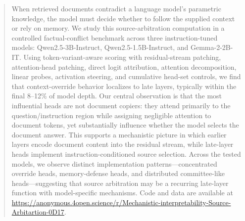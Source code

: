 \documentclass{article}
\begin{document}

\printAffiliationsAndNotice{}

\begin{abstract}
When retrieved documents contradict a language model's parametric knowledge, the model must decide whether to follow the supplied context or rely on memory. We study this source-arbitration computation in a controlled factual-conflict benchmark across three instruction-tuned models: Qwen2.5-3B-Instruct, Qwen2.5-1.5B-Instruct, and Gemma-2-2B-IT. Using token-variant-aware scoring with residual-stream patching, attention-head patching, direct logit attribution, attention decomposition, linear probes, activation steering, and cumulative head-set controls, we find that context-override behavior localizes to late layers, typically within the final 8--12\% of model depth. Our central observation is that the most influential heads are not document copiers: they attend primarily to the question/instruction region while assigning negligible attention to document tokens, yet substantially influence whether the model selects the document answer. This supports a mechanistic picture in which earlier layers encode document content into the residual stream, while late-layer heads implement instruction-conditioned source selection. Across the tested models, we observe distinct implementation patterns---concentrated override heads, memory-defense heads, and distributed committee-like heads---suggesting that source arbitration may be a recurring late-layer function with model-specific mechanisms. Code and data are available at \url{https://anonymous.4open.science/r/Mechanistic-interpretability-Source-Arbitartion-0D17}.
\end{abstract}
\end{document}
